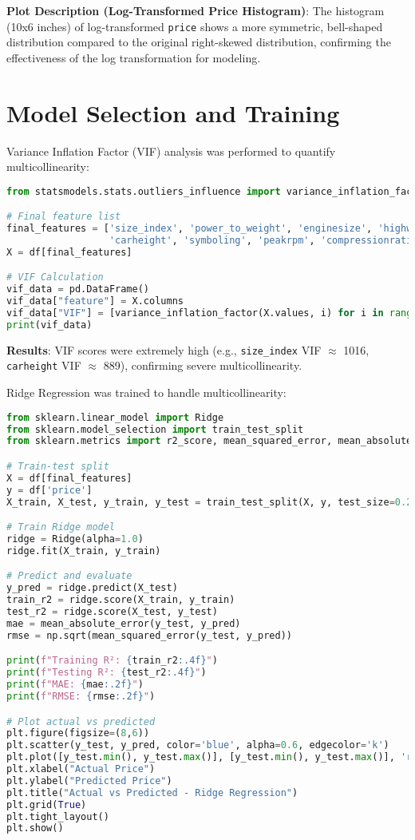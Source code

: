 \documentclass[12pt]{article}
\begin{document}
\textbf{Plot Description (Log-Transformed Price Histogram)}: The histogram (10x6 inches) of log-transformed \texttt{price} shows a more symmetric, bell-shaped distribution compared to the original right-skewed distribution, confirming the effectiveness of the log transformation for modeling.

\section{Model Selection and Training}
Variance Inflation Factor (VIF) analysis was performed to quantify multicollinearity:

\begin{lstlisting}[language=Python, caption=VIF Calculation Code]
from statsmodels.stats.outliers_influence import variance_inflation_factor

# Final feature list
final_features = ['size_index', 'power_to_weight', 'enginesize', 'highwaympg',
                  'carheight', 'symboling', 'peakrpm', 'compressionratio']
X = df[final_features]

# VIF Calculation
vif_data = pd.DataFrame()
vif_data["feature"] = X.columns
vif_data["VIF"] = [variance_inflation_factor(X.values, i) for i in range(X.shape[1])]
print(vif_data)
\end{lstlisting}

\textbf{Results}: VIF scores were extremely high (e.g., \texttt{size\_index} VIF $\approx$ 1016, \texttt{carheight} VIF $\approx$ 889), confirming severe multicollinearity.

Ridge Regression was trained to handle multicollinearity:

\begin{lstlisting}[language=Python, caption=Ridge Regression Code]
from sklearn.linear_model import Ridge
from sklearn.model_selection import train_test_split
from sklearn.metrics import r2_score, mean_squared_error, mean_absolute_error

# Train-test split
X = df[final_features]
y = df['price']
X_train, X_test, y_train, y_test = train_test_split(X, y, test_size=0.2, random_state=42)

# Train Ridge model
ridge = Ridge(alpha=1.0)
ridge.fit(X_train, y_train)

# Predict and evaluate
y_pred = ridge.predict(X_test)
train_r2 = ridge.score(X_train, y_train)
test_r2 = ridge.score(X_test, y_test)
mae = mean_absolute_error(y_test, y_pred)
rmse = np.sqrt(mean_squared_error(y_test, y_pred))

print(f"Training R²: {train_r2:.4f}")
print(f"Testing R²: {test_r2:.4f}")
print(f"MAE: {mae:.2f}")
print(f"RMSE: {rmse:.2f}")

# Plot actual vs predicted
plt.figure(figsize=(8,6))
plt.scatter(y_test, y_pred, color='blue', alpha=0.6, edgecolor='k')
plt.plot([y_test.min(), y_test.max()], [y_test.min(), y_test.max()], 'r--', lw=2)
plt.xlabel("Actual Price")
plt.ylabel("Predicted Price")
plt.title("Actual vs Predicted - Ridge Regression")
plt.grid(True)
plt.tight_layout()
plt.show()
\end{lstlisting}
\end{document}
